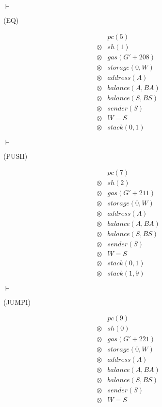 $\vdash$ \begin{flushright}(EQ)\end{flushright}

\[
  \begin{array}{rcl}
    &&pc(5)\\
    &\otimes&sh(1)\\
    &\otimes&gas(G' + 208)\\
    &\otimes&storage(0, W)\\
    &\otimes&address(A)\\
    &\otimes&balance(A, BA)\\
    &\otimes&balance(S, BS)\\
    &\otimes&sender(S)\\
    &\otimes& W = S\\
    &\otimes& stack(0, 1)
  \end{array}
\]

$\vdash$ \begin{flushright}(PUSH)\end{flushright}

\[
  \begin{array}{rcl}
    &&pc(7)\\
    &\otimes& sh(2)\\
    &\otimes& gas(G' + 211)\\
    &\otimes& storage(0, W)\\
    &\otimes& address(A)\\
    &\otimes& balance(A, BA)\\
    &\otimes& balance(S, BS)\\
    &\otimes& sender(S)\\
    &\otimes& W = S\\
    &\otimes& stack(0, 1)\\
    &\otimes& stack(1, 9)
  \end{array}
\]

$\vdash$ \begin{flushright}(JUMPI)\end{flushright}

\[
  \begin{array}{rcl}
    &&pc(9)\\
    &\otimes& sh(0)\\
    &\otimes& gas(G' + 221)\\
    &\otimes& storage(0, W)\\
    &\otimes& address(A)\\
    &\otimes& balance(A, BA)\\
    &\otimes& balance(S, BS)\\
    &\otimes& sender(S)\\
    &\otimes& W = S
  \end{array}
\]

